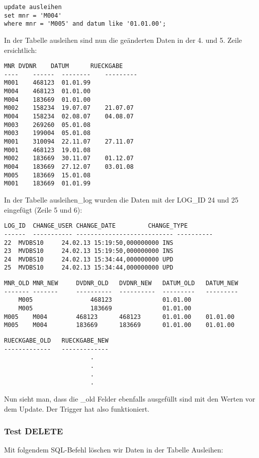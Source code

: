 \documentclass[11pt,a4paper,parskip=half]{scrartcl}
\begin{document}
\begin{lstlisting}
update ausleihen
set mnr = 'M004'
where mnr = 'M005' and datum like '01.01.00';
\end{lstlisting}

In der Tabelle ausleihen sind nun die geänderten Daten in der 4. und 5. Zeile ersichtlich:

\begin{lstlisting}
MNR	DVDNR	 DATUM		RUECKGABE
---- 	------	-------- 	---------
M001	468123 	01.01.99	
M004	468123	01.01.00	
M004	183669	01.01.00	
M002	158234 	19.07.07	21.07.07  
M004	158234 	02.08.07	04.08.07  
M003	269260 	05.01.08	
M003	199004 	05.01.08	
M001	310094 	22.11.07	27.11.07  
M001	468123 	19.01.08	
M002	183669 	30.11.07	01.12.07  
M004	183669 	27.12.07	03.01.08  
M005	183669	15.01.08	
M001	183669	01.01.99	
\end{lstlisting}

In der Tabelle ausleihen\_log wurden die Daten mit der LOG\_ID 24 und 25 eingefügt (Zeile 5 und 6):

\begin{lstlisting}
LOG_ID	CHANGE_USER	CHANGE_DATE			CHANGE_TYPE	
------	-----------	---------------------------	----------		
22	MVDBS10		24.02.13 15:19:50,000000000	INS					
23	MVDBS10		24.02.13 15:19:50,000000000	INS					
24	MVDBS10		24.02.13 15:34:44,000000000	UPD					
25	MVDBS10		24.02.13 15:34:44,000000000	UPD					
\end{lstlisting}

\begin{lstlisting}
MNR_OLD	MNR_NEW		DVDNR_OLD	DVDNR_NEW	DATUM_OLD	DATUM_NEW	
-------	-------		----------	----------	---------	--------- 	
	M005				468123				01.01.00					
	M005				183669				01.01.00					
M005	M004		468123		468123		01.01.00	01.01.00				
M005	M004		183669		183669		01.01.00	01.01.00				
\end{lstlisting}
\begin{lstlisting}
RUECKGABE_OLD	RUECKGABE_NEW
-------------	-------------	
						.
						.
						.
						.
\end{lstlisting}

Nun sieht man, dass die \_old Felder ebenfalls ausgefüllt sind mit den Werten vor dem Update. Der Trigger hat also funktioniert.

\subsubsection{Test DELETE}
Mit folgendem SQL-Befehl löschen wir Daten in der Tabelle Ausleihen:
\end{document}
